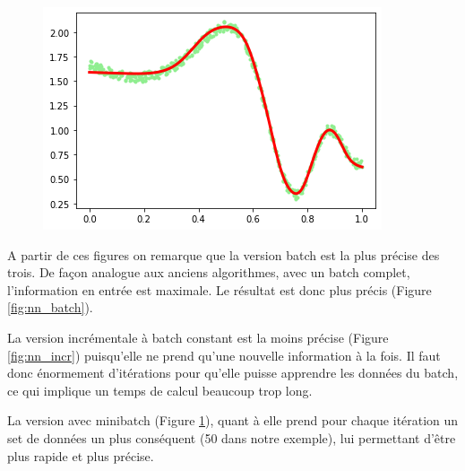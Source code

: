 \documentclass[french,12pt]{article}
\begin{document}
\begin{figure}[ht]
\begin{minipage}{.33\textwidth}
	\includegraphics[width=\textwidth]{nn_incr_mb.png}
	\label{fig:nn_incr_mb}
\end{minipage}
\end{figure}

A partir de ces figures on remarque que la version batch est la plus précise des trois. De façon analogue aux anciens algorithmes, avec un batch complet, l’information en entrée est maximale. Le résultat est donc plus précis (Figure \ref{fig:nn_batch}).

La version incrémentale à batch constant est la moins précise (Figure \ref{fig:nn_incr}) puisqu'elle ne prend qu'une nouvelle information à la fois. Il faut donc énormement d'itérations pour qu'elle puisse apprendre les données du batch, ce qui implique un temps de calcul beaucoup trop long.

La version avec minibatch (Figure \ref{fig:nn_incr_mb}), quant à elle prend pour chaque itération un set de données un plus conséquent (50 dans notre exemple), lui permettant d'être plus rapide et plus précise.
\end{document}
